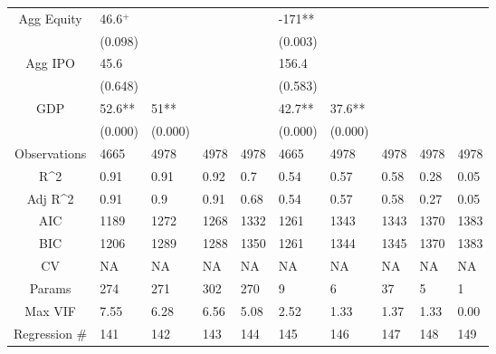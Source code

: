 \documentclass{article}
\begin{document}
\begin{table}[H]
\begin{tabular}{|clllllllll|}
  Agg Equity & 46.6$^{+}$ &  &  &  & -171** &  &  &  &  \\ 
   & (0.098) &  &  &  & (0.003) &  &  &  &  \\ 
  Agg IPO & 45.6 &  &  &  & 156.4 &  &  &  &  \\ 
   & (0.648) &  &  &  & (0.583) &  &  &  &  \\ 
  GDP & 52.6** & 51** &  &  & 42.7** & 37.6** &  &  &  \\ 
   & (0.000) & (0.000) &  &  & (0.000) & (0.000) &  &  &  \\ 
  \hline 
 Observations & 4665 & 4978 & 4978 & 4978 & 4665 & 4978 & 4978 & 4978 & 4978 \\ 
  R^2 & 0.91 & 0.91 & 0.92 & 0.7 & 0.54 & 0.57 & 0.58 & 0.28 & 0.05 \\ 
  Adj R^2 & 0.91 & 0.9 & 0.91 & 0.68 & 0.54 & 0.57 & 0.58 & 0.27 & 0.05 \\ 
  AIC & 1189 & 1272 & 1268 & 1332 & 1261 & 1343 & 1343 & 1370 & 1383 \\ 
  BIC & 1206 & 1289 & 1288 & 1350 & 1261 & 1344 & 1345 & 1370 & 1383 \\ 
  CV & NA & NA & NA & NA & NA & NA & NA & NA & NA \\ 
  Params & 274 & 271 & 302 & 270 & 9 & 6 & 37 & 5 & 1 \\ 
  Max VIF & 7.55 & 6.28 & 6.56 & 5.08 & 2.52 & 1.33 & 1.37 & 1.33 & 0.00 \\ 
  Regression \# & 141 & 142 & 143 & 144 & 145 & 146 & 147 & 148 & 149 \\ 
   \hline
\end{tabular}
 
\end{table}
\end{document}
